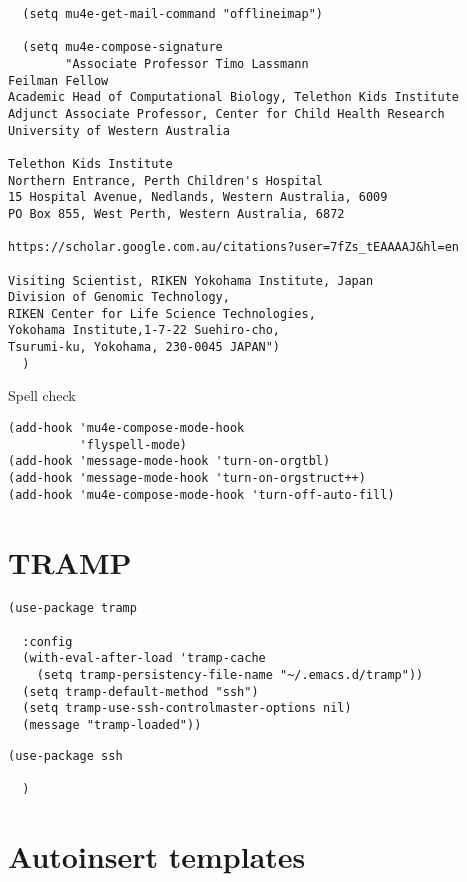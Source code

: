 \documentclass[12pt]{article}
\begin{document}
\begin{verbatim}
  (setq mu4e-get-mail-command "offlineimap")

  (setq mu4e-compose-signature
        "Associate Professor Timo Lassmann
Feilman Fellow
Academic Head of Computational Biology, Telethon Kids Institute
Adjunct Associate Professor, Center for Child Health Research
University of Western Australia

Telethon Kids Institute
Northern Entrance, Perth Children's Hospital
15 Hospital Avenue, Nedlands, Western Australia, 6009
PO Box 855, West Perth, Western Australia, 6872 

https://scholar.google.com.au/citations?user=7fZs_tEAAAAJ&hl=en

Visiting Scientist, RIKEN Yokohama Institute, Japan
Division of Genomic Technology,
RIKEN Center for Life Science Technologies,
Yokohama Institute,1-7-22 Suehiro-cho,
Tsurumi-ku, Yokohama, 230-0045 JAPAN")
  )
\end{verbatim}



Spell check 

\begin{verbatim}
(add-hook 'mu4e-compose-mode-hook
          'flyspell-mode)
(add-hook 'message-mode-hook 'turn-on-orgtbl)
(add-hook 'message-mode-hook 'turn-on-orgstruct++)
(add-hook 'mu4e-compose-mode-hook 'turn-off-auto-fill)
\end{verbatim}

\section{TRAMP}
\label{sec:org5a7c9a4}

\begin{verbatim}
(use-package tramp

  :config
  (with-eval-after-load 'tramp-cache
    (setq tramp-persistency-file-name "~/.emacs.d/tramp"))
  (setq tramp-default-method "ssh")
  (setq tramp-use-ssh-controlmaster-options nil) 
  (message "tramp-loaded"))
\end{verbatim}

\begin{verbatim}
(use-package ssh

  )
\end{verbatim}

\section{Autoinsert templates}
\label{sec:org4f9309c}
\end{document}
